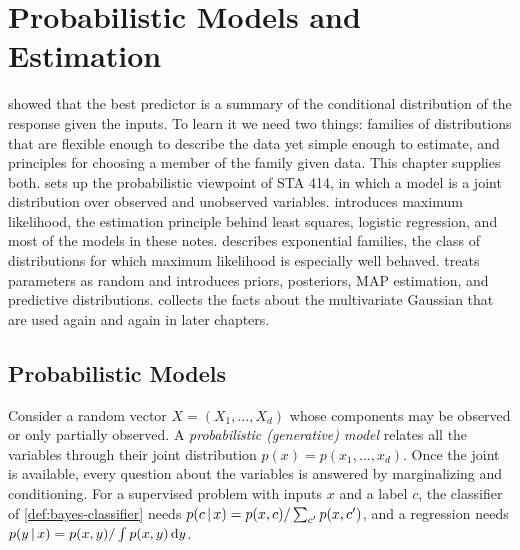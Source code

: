 \chapter{Probabilistic Models and Estimation}\label{ch:probability}

 showed that the best predictor is a summary of the conditional distribution of the response given the inputs. To learn it we need two things: families of distributions that are flexible enough to describe the data yet simple enough to estimate, and principles for choosing a member of the family given data. This chapter supplies both.  sets up the probabilistic viewpoint of STA 414, in which a model is a joint distribution over observed and unobserved variables.  introduces maximum likelihood, the estimation principle behind least squares, logistic regression, and most of the models in these notes.  describes exponential families, the class of distributions for which maximum likelihood is especially well behaved.  treats parameters as random and introduces priors, posteriors, MAP estimation, and predictive distributions.  collects the facts about the multivariate Gaussian that are used again and again in later chapters.

\section{Probabilistic Models}\label{sec:prob-models}

Consider a random vector $X=(X_1,\dots,X_d)$ whose components may be observed or only partially observed. A \emph{probabilistic (generative) model} relates all the variables through their joint distribution $p(x)=p(x_1,\dots,x_d)$. Once the joint is available, every question about the variables is answered by marginalizing and conditioning. For a supervised problem with inputs $x$ and a label $c$, the classifier of \cref{def:bayes-classifier} needs $p(c\,|\, x)=p(x,c)/\sum_{c'}p(x,c')$, and a regression needs $p(y\,|\, x)=p(x,y)/\int p(x,y)\,\mathrm{d} y$.

